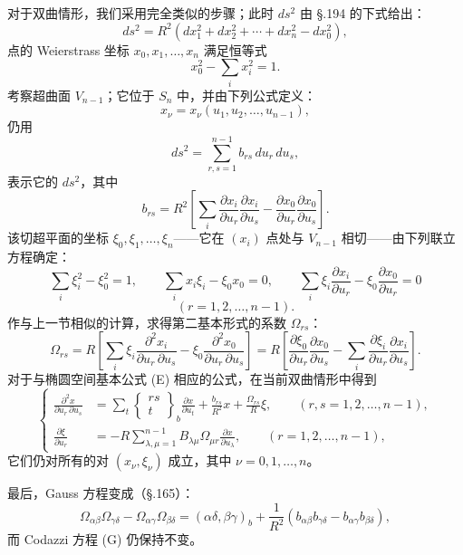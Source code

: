 对于双曲情形，我们采用完全类似的步骤；此时 $ds^2$ 由 \S.194 的下式给出：
\[
\tag{27}
ds^2=R^2(dx_1^2+dx_2^2+\cdots+dx_n^2-dx_0^2),
\]
点的 Weierstrass 坐标 $x_0,x_1,\ldots,x_n$ 满足恒等式
\[
\tag{28}
x_0^2-\sum_i x_i^2=1.
\]
考察超曲面 $V_{n-1}$；它位于 $S_n$ 中，并由下列公式定义：
\[
x_\nu=x_\nu(u_1,u_2,\ldots,u_{n-1}),
\]
仍用
\[
\tag{29}
ds^2=\sum_{r,s=1}^{n-1}b_{rs}\,du_r\,du_s,
\]
表示它的 $ds^2$，其中
\[
\tag{30}
b_{rs}=R^2\left[\sum_i\frac{\partial x_i}{\partial u_r}\frac{\partial x_i}{\partial u_s}
-\frac{\partial x_0}{\partial u_r}\frac{\partial x_0}{\partial u_s}\right].
\]
该切超平面的坐标 $\xi_0,\xi_1,\ldots,\xi_n$——它在 $(x_i)$ 点处与 $V_{n-1}$ 相切——由下列联立方程确定：
\[
\tag{31}
\sum_i\xi_i^2-\xi_0^2=1,\qquad
\sum_i x_i\xi_i-\xi_0x_0=0,\qquad
\sum_i\xi_i\frac{\partial x_i}{\partial u_r}-\xi_0\frac{\partial x_0}{\partial u_r}=0
\]
\[
(r=1,2,\ldots,n-1).
\]
作与上一节相似的计算，求得第二基本形式的系数 $\Omega_{rs}$：
\[
\tag{32}
\Omega_{rs}=R\left[\sum_i\xi_i\frac{\partial^2x_i}{\partial u_r\,\partial u_s}
-\xi_0\frac{\partial^2x_0}{\partial u_r\,\partial u_s}\right]
=R\left[\frac{\partial\xi_0}{\partial u_r}\frac{\partial x_0}{\partial u_s}
-\sum_i\frac{\partial\xi_i}{\partial u_r}\frac{\partial x_i}{\partial u_s}\right].
\]
对于与椭圆空间基本公式 (E) 相应的公式，在当前双曲情形中得到
\[
\tag{E*}
\left\{
\begin{aligned}
\frac{\partial^2x}{\partial u_r\,\partial u_s}
&=\sum_t\left\{\begin{matrix}rs\\ t\end{matrix}\right\}_b
\frac{\partial x}{\partial u_t}
+\frac{b_{rs}}{R^2}x+\frac{\Omega_{rs}}{R}\xi,
\qquad (r,s=1,2,\ldots,n-1),\\
\frac{\partial\xi}{\partial u_r}
&=-R\sum_{\lambda,\mu=1}^{n-1}B_{\lambda\mu}\Omega_{\mu r}
\frac{\partial x}{\partial u_\lambda},
\qquad (r=1,2,\ldots,n-1),
\end{aligned}\right.
\]
它们仍对所有的对 $(x_\nu,\xi_\nu)$ 成立，其中 $\nu=0,1,\ldots,n$。

最后，Gauss 方程变成（\S.165）：
\[
\tag{F*}
\Omega_{\alpha\beta}\Omega_{\gamma\delta}-\Omega_{\alpha\gamma}\Omega_{\beta\delta}
=(\alpha\delta,\beta\gamma)_b+\frac1{R^2}(b_{\alpha\beta}b_{\gamma\delta}-b_{\alpha\gamma}b_{\beta\delta}),
\]
而 Codazzi 方程 (G) 仍保持不变。

